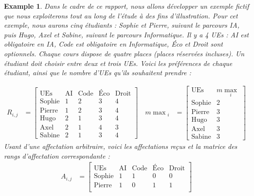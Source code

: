 \documentclass{rapport}
\theoremstyle{definition}
\theoremstyle{remark}
\theoremstyle{plain}
\newtheorem{example}{Example}
\theoremstyle{definition}
\theoremstyle{definition}
\theoremstyle{remark}
\theoremstyle{definition}
\begin{document}
\begin{example}\label{ex:running1}
    Dans le cadre de ce rapport, nous allons développer un exemple fictif que nous exploiterons tout au long de l'étude à des fins d'illustration.
    Pour cet exemple, nous aurons cinq étudiants : Sophie et Pierre, suivant le parcours IA, puis Hugo, Axel et Sabine, suivant le parcours Informatique.
    Il y a 4 UEs : AI est obligatoire en IA, Code est obligatoire en Informatique, Éco et Droit sont optionnels. Chaque cours dispose de quatre places (places réservées incluses).
    Un étudiant doit choisir entre deux et trois UEs. Voici les préférences de chaque étudiant, ainsi que le nombre d'UEs qu'ils souhaitent prendre :

    $$
    \begin{aligned}
    R_{i,j} &=
        \begin{bmatrix}
            \text{UEs} & \text{AI} & \text{Code} & \text{Éco} & \text{Droit}\\
            \text{Sophie} & 1 & 2 & 3 & 4\\
            \text{Pierre} & 1 & 2 & 3 & 4\\
            \text{Hugo} & 2 & 1 & 3 & 4\\
            \text{Axel} & 2 & 1 & 4 & 3\\
            \text{Sabine} & 2 & 1 & 3 & 4
        \end{bmatrix}
    \quad
    m\!\max\!_i &=
        \begin{bmatrix}
            \text{UEs} & m\!\max_i\\
            \text{Sophie} & 2\\
            \text{Pierre} & 3\\
            \text{Hugo} & 3\\
            \text{Axel} & 3\\
            \text{Sabine} & 3
        \end{bmatrix}
    \end{aligned}
    $$
    Usant d'une affectation arbitraire, voici les affectations reçus et la matrice des rangs d'affectation correspondante :
    $$
    \begin{aligned}
    A_{i,j} &=
        \begin{bmatrix}
            \text{UEs} & \text{AI} & \text{Code} & \text{Éco} & \text{Droit}\\
            \text{Sophie} & 1 & 1 & 0 & 0\\
            \text{Pierre} & 1 & 0 & 1 & 1\\

\end{bmatrix}
\end{aligned}$$
\end{example}
\end{document}
